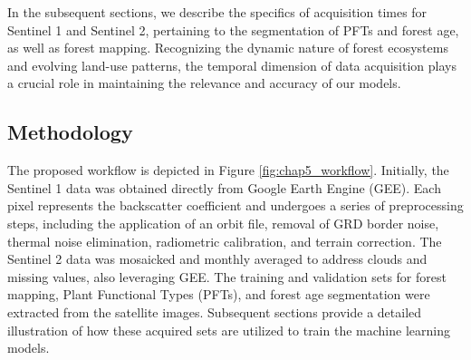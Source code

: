 In the subsequent sections, we describe the specifics of acquisition times for Sentinel 1 and Sentinel 2, pertaining to the segmentation of PFTs and forest age, as well as forest mapping. Recognizing the dynamic nature of forest ecosystems and evolving land-use patterns, the temporal dimension of data acquisition plays a crucial role in maintaining the relevance and accuracy of our models. \par

\subsection{Methodology} \label{chap5_method}
The proposed workflow is depicted in Figure \ref{fig:chap5_workflow}. Initially, the Sentinel 1 data was obtained directly from Google Earth Engine (GEE). Each pixel represents the backscatter coefficient and undergoes a series of preprocessing steps, including the application of an orbit file, removal of GRD border noise, thermal noise elimination, radiometric calibration, and terrain correction. The Sentinel 2 data was mosaicked and monthly averaged to address clouds and missing values, also leveraging GEE. The training and validation sets for forest mapping, Plant Functional Types (PFTs), and forest age segmentation were extracted from the satellite images. Subsequent sections provide a detailed illustration of how these acquired sets are utilized to train the machine learning models. \par


